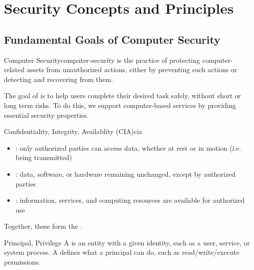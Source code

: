 \chapter{Security Concepts and Principles}

\section{Fundamental Goals of Computer Security}

\begin{dfnbox}{Computer Security}{computer-security}
     is the practice of protecting computer-related assets from unauthorized actions, either by preventing such actions or detecting and recovering from them.
\end{dfnbox}

The goal of  is to help users complete their desired task safely, without short or long term risks.  To do this, we support computer-based services by providing essential security properties.

\begin{dfnbox}{Confidentiality, Integrity, Availablity (CIA)}{cia}
    \begin{itemize}[noitemsep]
        \item {}: only authorized parties can access data, whether at rest or in motion (i.e. being transmitted)
        \item {}: data, software, or hardware remaining unchanged, except by authorized parties
        \item {}: information, services, and computing resources are available for authorized use
    \end{itemize}
    Together, these form the .
\end{dfnbox}

\begin{dfnbox}{Principal, Privilege}{}
    A  is an entity with a given identity, such as a user, service, or system process. A  defines what a principal can do, such as read/write/execute permissions.
\end{dfnbox}

